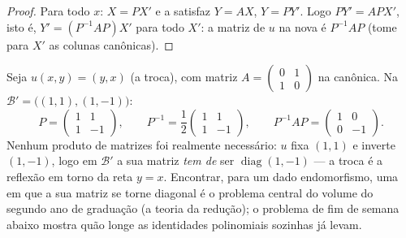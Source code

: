 \begin{proof}
Para todo $x$: $X = PX'$ e a  satisfaz $Y = AX$, $Y = PY'$.
Logo $PY' = APX'$, isto é, $Y' = (P^{-1}AP)X'$ para todo $X'$: a matriz de $u$ na nova
 é $P^{-1}AP$ (tome para $X'$ as colunas canônicas).
\end{proof}

\begin{example}
\label{ex:b1:matrices:conjugationrun}
Seja $u(x, y) = (y, x)$ (a troca), com matriz $A = \begin{pmatrix} 0
& 1\\ 1 & 0\end{pmatrix}$ na  canônica. Na 
$\mathcal B' = \bigl((1,1), (1,-1)\bigr)$:
\[
P = \begin{pmatrix} 1 & 1\\ 1 & -1 \end{pmatrix},
\qquad
P^{-1} = \frac12\begin{pmatrix} 1 & 1\\ 1 & -1 \end{pmatrix},
\qquad
P^{-1} A P = \begin{pmatrix} 1 & 0\\ 0 & -1 \end{pmatrix}.
\]
Nenhum produto de matrizes foi realmente necessário: $u$ fixa
$(1,1)$ e inverte $(1,-1)$, logo em $\mathcal B'$ a sua matriz \emph{tem de}
ser $\operatorname{diag}(1, -1)$ --- a troca é a reflexão em torno da reta $y = x$.
Encontrar, para um dado endomorfismo, uma  em que a sua matriz
se torne diagonal é o problema central do volume do segundo ano de
graduação (a teoria da redução); o problema de fim de semana abaixo
mostra quão longe as identidades polinomiais sozinhas já levam.
\end{example}

